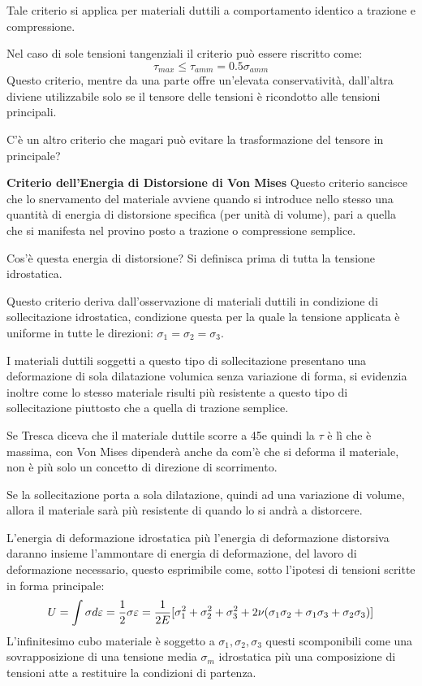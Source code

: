\documentclass{article}
\begin{document}
\begin{adjustwidth}{2in}{}
	 	Tale criterio si applica per materiali duttili a comportamento identico a trazione e compressione. \newline 
	 	
	 	Nel caso di sole tensioni tangenziali il criterio può essere riscritto come:
	 	\[\tau_{max}\leq\tau_{amm} = 0.5\sigma_{amm}\]
	 	Questo criterio, mentre da una parte offre un'elevata conservatività, dall'altra diviene utilizzabile solo se il tensore delle tensioni è ricondotto alle tensioni principali.  
	 	
	 	C'è un altro criterio che magari può evitare la trasformazione del tensore in principale? \newline 
	 	
	 	\textbf{{\Large Criterio dell'Energia di Distorsione di Von Mises}} \newline 
	 	Questo criterio sancisce che lo snervamento del materiale avviene quando si introduce nello stesso una quantità di energia di distorsione specifica (per unità di volume), pari a quella che si manifesta nel provino posto a trazione o compressione semplice. \newline 
	 	
	 	Cos'è questa energia di distorsione? Si definisca prima di tutta la tensione idrostatica. 
	 	
	 	Questo criterio deriva dall'osservazione di materiali duttili in condizione di sollecitazione idrostatica, condizione questa per la quale la tensione applicata è uniforme in tutte le direzioni: $\sigma_1=\sigma_2=\sigma_3$. 
	 	
	 	I materiali duttili soggetti a questo tipo di sollecitazione presentano una deformazione di sola dilatazione volumica senza variazione di forma, si evidenzia inoltre come lo stesso materiale risulti più resistente a questo tipo di sollecitazione piuttosto che a quella di trazione semplice. \newline 
	 	
	 	Se Tresca diceva che il materiale duttile scorre a 45\degree e quindi la $\tau$ è lì che è massima, con Von Mises dipenderà anche da com'è che si deforma il materiale, non è più solo un concetto di direzione di scorrimento. \newline 
	 	
	 	Se la sollecitazione porta a sola dilatazione, quindi ad una variazione di volume, allora il materiale sarà più resistente di quando lo si andrà a distorcere. 
	 	
	 	L'energia di deformazione idrostatica più l'energia di deformazione distorsiva daranno insieme l'ammontare di energia di deformazione, del lavoro di deformazione necessario, questo esprimibile come, sotto l'ipotesi di tensioni scritte in forma principale: 
	 	\[U = \int\sigma d\varepsilon = {1\over2}\sigma\varepsilon = {1\over2E}[\sigma_1^2 + \sigma_2^2 + \sigma_3^2 + 2\nu(\sigma_1\sigma_2 + \sigma_1\sigma_3 + \sigma_2\sigma_3) ]\]
	 	L'infinitesimo cubo materiale è soggetto a $\sigma_1, \sigma_2, \sigma_3$ questi scomponibili come una sovrapposizione di una tensione media $\sigma_m$ idrostatica più una composizione di tensioni atte a restituire la condizioni di partenza.
	 	

\end{adjustwidth}
\end{document}
